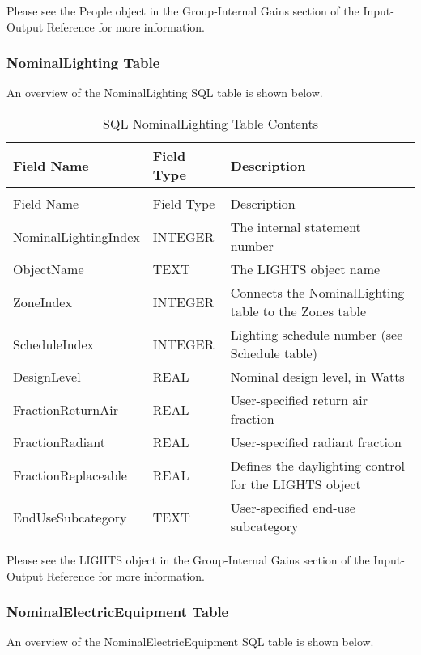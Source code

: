 Please see the People object in the Group-Internal Gains section of the Input-Output Reference for more information.

\subsubsection{NominalLighting Table}

An overview of the NominalLighting SQL table is shown below.

\begin{longtable}[c]{>{\raggedright}p{1.5in}>{\raggedright}p{1.5in}>{\raggedright}p{3.0in}}
\caption{SQL NominalLighting Table Contents \label{table:table-16.-sql-nominallighting-table-contents}} \tabularnewline
\toprule 
Field Name & Field Type & Description \tabularnewline
\midrule
\endfirsthead

\caption[]{SQL NominalLighting Table Contents} \tabularnewline
\toprule 
Field Name & Field Type & Description \tabularnewline
\midrule
\endhead

NominalLightingIndex & INTEGER & The internal statement number \tabularnewline
ObjectName & TEXT & The LIGHTS object name \tabularnewline
ZoneIndex & INTEGER & Connects the NominalLighting table to the Zones table \tabularnewline
ScheduleIndex & INTEGER & Lighting schedule number (see Schedule table) \tabularnewline
DesignLevel & REAL & Nominal design level, in Watts \tabularnewline
FractionReturnAir & REAL & User-specified return air fraction \tabularnewline
FractionRadiant & REAL & User-specified radiant fraction \tabularnewline
FractionReplaceable & REAL & Defines the daylighting control for the LIGHTS object \tabularnewline
EndUseSubcategory & TEXT & User-specified end-use subcategory \tabularnewline
\bottomrule
\end{longtable}

Please see the LIGHTS object in the Group-Internal Gains section of the Input-Output Reference for more information.

\subsubsection{NominalElectricEquipment Table}

An overview of the NominalElectricEquipment SQL table is shown below.

